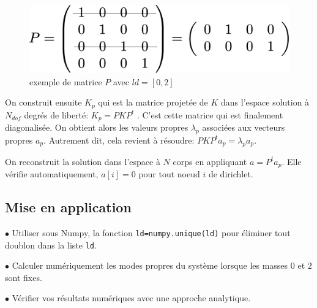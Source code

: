\documentclass[a4paper, 10pt]{article}
\begin{document}
\begin{figure}[!h]
\centering
\includegraphics[scale=0.25]{matP.eps}
\caption{exemple de matrice $P$ avec $ld=[0, 2]$}
\label{matP}
\end{figure}

On construit ensuite $K_p$ qui est la matrice projetée de $K$ dans l'espace
solution à $N_ {dof}$ degrés de liberté: $K_p=P K P^t$ .
C'est cette matrice qui est finalement diagonalisée. On obtient alors les valeurs propres $\lambda_p$ associées
aux vecteurs propres $a_p$. Autrement dit, cela revient à résoudre:
$P K P^t a_p= \lambda_p a_p$.

On reconstruit la solution dans l'espace à $N$ corps en appliquant $a=P^t a_p$. 
Elle vérifie automatiquement, $a[i]=0$ pour tout noeud $i$ de dirichlet.

\subsection{Mise en application}

$\bullet$ Utiliser sous Numpy, la fonction {\tt ld=numpy.unique(ld)} pour éliminer tout doublon dans la liste {\tt ld}.

$\bullet$ Calculer numériquement les modes propres du système lorsque les masses $0$ et $2$ sont fixes.

$\bullet$ Vérifier vos résultats numériques avec une approche analytique.
\end{document}
